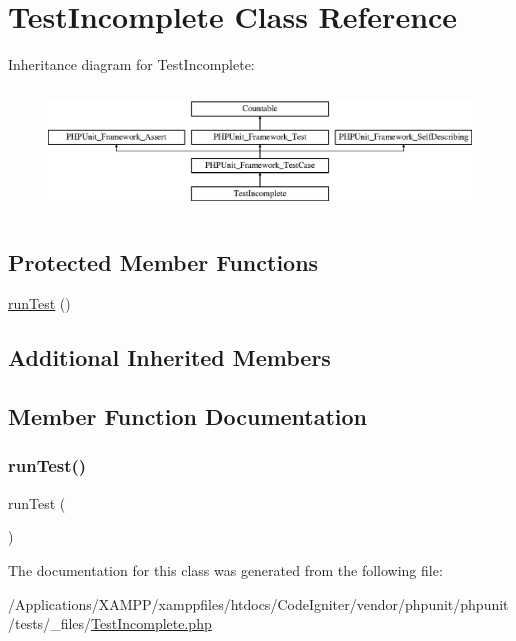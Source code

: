 \hypertarget{class_test_incomplete}{}\section{Test\+Incomplete Class Reference}
\label{class_test_incomplete}
Inheritance diagram for Test\+Incomplete\+:\begin{figure}[H]
\begin{center}
\leavevmode
\includegraphics[height=3.303835cm]{class_test_incomplete}
\end{center}
\end{figure}
\subsection*{Protected Member Functions}
\begin{DoxyCompactItemize}
\item 
\mbox{\hyperlink{class_test_incomplete_ad2541a093be4d619db04ed65d661a684}{run\+Test}} ()
\end{DoxyCompactItemize}
\subsection*{Additional Inherited Members}


\subsection{Member Function Documentation}
\mbox{\label{class_test_incomplete_ad2541a093be4d619db04ed65d661a684}} 
\subsubsection{\texorpdfstring{run\+Test()}{runTest()}}
{\footnotesize\ttfamily run\+Test (\begin{DoxyParamCaption}{ }\end{DoxyParamCaption})\hspace{0.3cm}{\ttfamily [protected]}}



The documentation for this class was generated from the following file\+:\begin{DoxyCompactItemize}
\item 
/\+Applications/\+X\+A\+M\+P\+P/xamppfiles/htdocs/\+Code\+Igniter/vendor/phpunit/phpunit/tests/\+\_\+files/\mbox{\hyperlink{_test_incomplete_8php}{Test\+Incomplete.\+php}}\end{DoxyCompactItemize}
